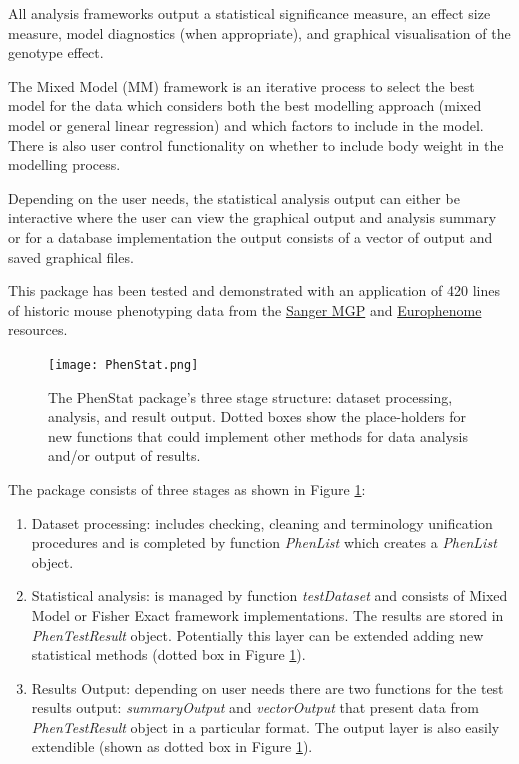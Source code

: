 \documentclass[12pt,a4paper]{article}
\begin{document}
All analysis frameworks output a statistical significance measure, an effect size measure, model diagnostics (when appropriate), and graphical visualisation of the genotype effect. 

The Mixed Model (MM) framework is an iterative process to select the best model for the data which considers both the best modelling approach (mixed model or general linear regression) and which factors to include in the model. There is also user control functionality on whether to include body weight in the modelling process. 

Depending on the user needs, the statistical analysis output can either be interactive where the user can view the graphical output and analysis summary or for a database implementation the output consists of a vector of output and saved graphical files. 

This package has been tested and demonstrated with an application of 420 lines of historic mouse phenotyping data from the  \href{http://www.sanger.ac.uk/mouseportal/}{Sanger MGP} and \href{http://www.europhenome.org/}{Europhenome} resources. 
\\

\begin{figure}[!htpb]%
\centerline{\texttt{[image: PhenStat.png]}}
\caption{The PhenStat package's three stage structure: dataset processing, analysis, and result output. Dotted boxes show the place-holders for new functions that could implement other methods for data analysis and/or output of results.}\label{fig:01}
\end{figure}

The package consists of three stages as shown in Figure \ref{fig:01}:
\begin{enumerate}
\item Dataset processing: includes checking, cleaning and terminology unification procedures and is completed by function \textit{PhenList} which creates a \textit{PhenList} object. 
\item Statistical analysis: is managed by function \textit{testDataset} and consists of Mixed Model or Fisher Exact framework implementations. The results are stored in \textit{PhenTestResult} object. 
Potentially this layer can be extended adding new statistical methods (dotted box in Figure \ref{fig:01}). 
\item Results Output: depending on user needs there are two functions for the test results output: \textit{summaryOutput} 
and \textit{vectorOutput} that present data from \textit{PhenTestResult} object in a particular format. The output layer is also easily extendible (shown as dotted box in Figure \ref{fig:01}).
\end{enumerate}
\end{document}
